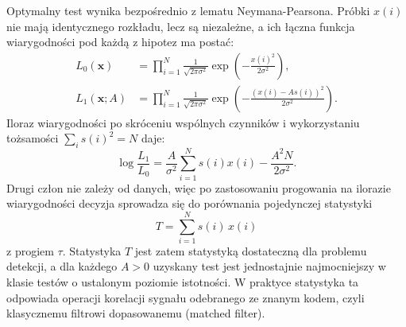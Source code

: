\documentclass[12pt,a4paper]{article}
\begin{document}
Optymalny test wynika bezpośrednio z lematu Neymana-Pearsona. Próbki $x(i)$ nie mają identycznego rozkładu, lecz są niezależne, a ich łączna funkcja wiarygodności pod każdą z hipotez ma postać:
\begin{align}
    L_0(\mathbf{x}) &= \prod_{i=1}^{N} \frac{1}{\sqrt{2\pi\sigma^2}} \exp\!\left(-\frac{x(i)^2}{2\sigma^2}\right), \\
    L_1(\mathbf{x}; A) &= \prod_{i=1}^{N} \frac{1}{\sqrt{2\pi\sigma^2}} \exp\!\left(-\frac{(x(i) - A s(i))^2}{2\sigma^2}\right).
\end{align}
Iloraz wiarygodności po skróceniu wspólnych czynników i wykorzystaniu tożsamości $\sum_i s(i)^2 = N$ daje:
\begin{equation}
    \log \frac{L_1}{L_0} = \frac{A}{\sigma^2} \sum_{i=1}^{N} s(i) x(i) - \frac{A^2 N}{2\sigma^2}.
\end{equation}
Drugi człon nie zależy od danych, więc po zastosowaniu progowania na ilorazie wiarygodności decyzja sprowadza się do porównania pojedynczej statystyki
\begin{equation}
    T = \sum_{i=1}^{N} s(i)\,x(i)
    \label{eq:T}
\end{equation}
z progiem $\tau$. Statystyka $T$ jest zatem statystyką dostateczną dla problemu detekcji, a dla każdego $A > 0$ uzyskany test jest jednostajnie najmocniejszy w klasie testów o ustalonym poziomie istotności. W praktyce statystyka ta odpowiada operacji korelacji sygnału odebranego ze znanym kodem, czyli klasycznemu filtrowi dopasowanemu (matched filter).
\end{document}
